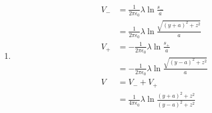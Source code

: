 \documentclass{article}
\begin{document}
\subsection{}

\begin{enumerate}
  \item

        \begin{align*}
          V_- & = \frac{1}{2 \pi \epsilon_0} \lambda \ln \frac{s_-}{a}                           \\
              & = \frac{1}{2 \pi \epsilon_0} \lambda \ln \frac{\sqrt{(y + a)^2 + z^2}}{a}        \\
          V_+ & = -\frac{1}{2 \pi \epsilon_0} \lambda \ln \frac{s_+}{a}                          \\
              & = -\frac{1}{2 \pi \epsilon_0} \lambda \ln \frac{\sqrt{(y - a)^2 + z^2}}{a}       \\
          V   & = V_- + V_+                                                                      \\
              & = \frac{1}{4 \pi \epsilon_0} \lambda \ln \frac{(y + a)^2 + z^2}{(y - a)^2 + z^2}
        \end{align*}
\end{enumerate}

\subsection{}
\end{document}
